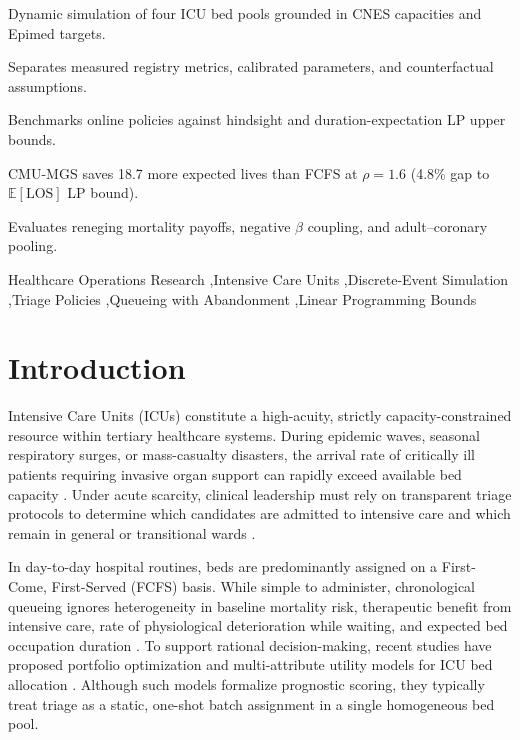 \documentclass[final,5p,times,twocolumn]{elsarticle}
\begin{document}
\begin{frontmatter}
\begin{highlights}
\item Dynamic simulation of four ICU bed pools grounded in CNES capacities and Epimed targets.
\item Separates measured registry metrics, calibrated parameters, and counterfactual assumptions.
\item Benchmarks online policies against hindsight and duration-expectation LP upper bounds.
\item CMU-MGS saves 18.7 more expected lives than FCFS at $\rho=1.6$ (4.8\% gap to $\mathbb{E}[\text{LOS}]$ LP bound).
\item Evaluates reneging mortality payoffs, negative $\beta$ coupling, and adult--coronary pooling.
\end{highlights}

\begin{keyword}
Healthcare Operations Research \sep Intensive Care Units \sep Discrete-Event Simulation \sep Triage Policies \sep Queueing with Abandonment \sep Linear Programming Bounds
\end{keyword}

\end{frontmatter}

\section{Introduction}
\label{sec:intro}

Intensive Care Units (ICUs) constitute a high-acuity, strictly capacity-constrained resource within tertiary healthcare systems. During epidemic waves, seasonal respiratory surges, or mass-casualty disasters, the arrival rate of critically ill patients requiring invasive organ support can rapidly exceed available bed capacity \cite{grasselli2020critical, aquino2022ethical}. Under acute scarcity, clinical leadership must rely on transparent triage protocols to determine which candidates are admitted to intensive care and which remain in general or transitional wards \cite{craxi2020rationing, dieteren2022should, White_2021}.

In day-to-day hospital routines, beds are predominantly assigned on a First-Come, First-Served (FCFS) basis. While simple to administer, chronological queueing ignores heterogeneity in baseline mortality risk, therapeutic benefit from intensive care, rate of physiological deterioration while waiting, and expected bed occupation duration \cite{Frej_2021, sun2018patient}. To support rational decision-making, recent studies have proposed portfolio optimization and multi-attribute utility models for ICU bed allocation \cite{Frej_2021, Frej_2023}. Although such models formalize prognostic scoring, they typically treat triage as a static, one-shot batch assignment in a single homogeneous bed pool.
\end{document}
